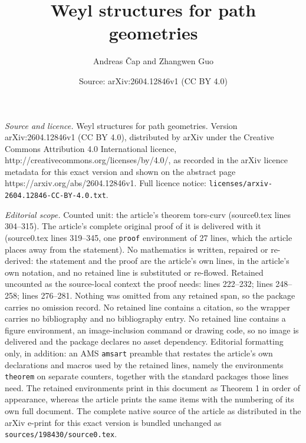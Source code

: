 \documentclass[10pt,a4paper]{amsart}
\title{Weyl structures for path geometries}
\author{Andreas \v Cap and Zhangwen Guo}
\date{Source: arXiv:2604.12846v1 (CC BY 4.0)}
\begin{document}
\maketitle

\noindent\emph{Source and licence.} Weyl structures for path geometries. Version arXiv:2604.12846v1 (CC BY 4.0), distributed by arXiv under the Creative Commons Attribution 4.0 International licence, http://creativecommons.org/licenses/by/4.0/, as recorded in the arXiv licence metadata for this exact version and shown on the abstract page https://arxiv.org/abs/2604.12846v1. Full licence notice: \texttt{licenses/arxiv-2604.12846-CC-BY-4.0.txt}.\par\smallskip

\noindent\textit{Editorial scope.} Counted unit: the article's theorem tors-curv (source0.tex lines 304--315). The article's complete original proof of it is delivered with it (source0.tex lines 319--345, one \texttt{proof} environment of 27 lines, which the article places away from the statement). No mathematics is written, repaired or re-derived: the statement and the proof are the article's own lines, in the article's own notation, and no retained line is substituted or re-flowed.  Retained uncounted as the source-local context the proof needs: lines 222--232; lines 248--258; lines 276--281.  Nothing was omitted from any retained span, so the package carries no omission record.  No retained line contains a citation, so the wrapper carries no bibliography and no bibliography entry.  No retained line contains a figure environment, an image-inclusion command or drawing code, so no image is delivered and the package declares no asset dependency.  Editorial formatting only, in addition: an AMS \texttt{amsart} preamble that restates the article's own declarations and macros used by the retained lines, namely the environments \texttt{theorem} on separate counters, together with the standard packages those lines need.  The retained environments print in this document as Theorem 1 in order of appearance, whereas the article prints the same items with the numbering of its own full document.  The complete native source of the article as distributed in the arXiv e-print for this exact version is bundled unchanged as \texttt{sources/198430/source0.tex}.
\end{document}
